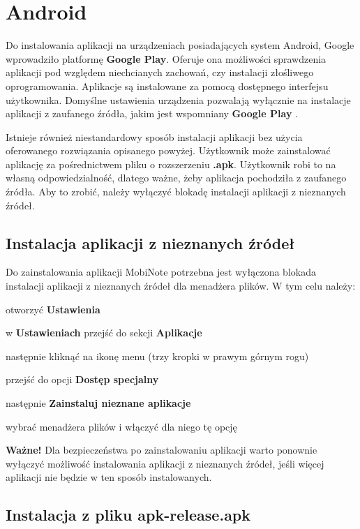 \documentclass[shortabstract]{iithesis}
\begin{document}
\section{Android}

 Do instalowania aplikacji na urządzeniach posiadających system Android, Google wprowadziło platformę \textbf{Google Play}. Oferuje ona możliwości sprawdzenia aplikacji pod względem niechcianych zachowań, czy instalacji złośliwego oprogramowania. Aplikacje są instalowane za pomocą dostępnego interfejsu użytkownika. Domyślne ustawienia urządzenia pozwalają wyłącznie na instalacje aplikacji z zaufanego źródła, jakim jest wspomniany \textbf{Google Play} \cite{googleplay}.

Istnieje również niestandardowy sposób instalacji aplikacji bez użycia oferowanego rozwiązania opisanego powyżej. Użytkownik może zainstalować aplikację za pośrednictwem pliku o rozszerzeniu \textbf{.apk}. Użytkownik robi to na własną odpowiedzialność, dlatego ważne, żeby aplikacja pochodziła z zaufanego źródła. Aby to zrobić, należy wyłączyć blokadę instalacji aplikacji z nieznanych źródeł.

\subsection{Instalacja aplikacji z nieznanych źródeł}
Do zainstalowania aplikacji MobiNote potrzebna jest wyłączona blokada instalacji aplikacji z nieznanych źródeł dla menadżera plików.
W tym celu należy:
\begin{compactitem}
    \item otworzyć \textbf{Ustawienia}
    \item w \textbf{Ustawieniach} przejść do sekcji \textbf{Aplikacje}
    \item następnie kliknąć na ikonę menu (trzy kropki w prawym górnym rogu)
    \item przejść do opcji \textbf{Dostęp specjalny}
    \item następnie \textbf{Zainstaluj nieznane aplikacje}
    \item wybrać menadżera plików i włączyć dla niego tę opcję
\end{compactitem}

\textbf{Ważne!} Dla bezpieczeństwa po zainstalowaniu aplikacji warto ponownie wyłączyć możliwość instalowania aplikacji z nieznanych źródeł, jeśli więcej aplikacji nie będzie w ten sposób instalowanych.

\subsection{Instalacja z pliku apk-release.apk}
\end{document}

